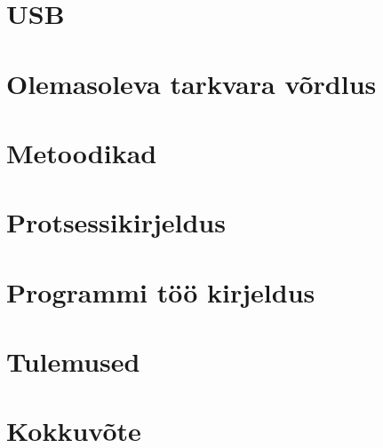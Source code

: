 \documentclass[12pt, a4paper]{report}
\begin{document}
\chapter{USB}\label{chapter:usb}


\chapter{Olemasoleva tarkvara võrdlus}\label{chapter:soft}


\chapter{Metoodikad}\label{chapter:metoodika}


\chapter{Protsessikirjeldus}\label{chapter:protsess}


\chapter{Programmi töö kirjeldus}\label{chapter:kirjeldus}


\chapter{Tulemused}\label{chapter:tulemused}


\chapter{Kokkuvõte}\label{chapter:summary} 


\pagebreak
{}
\renewcommand{\bibname}{Kasutatud kirjandus}
\printbibliography



\end{document}
